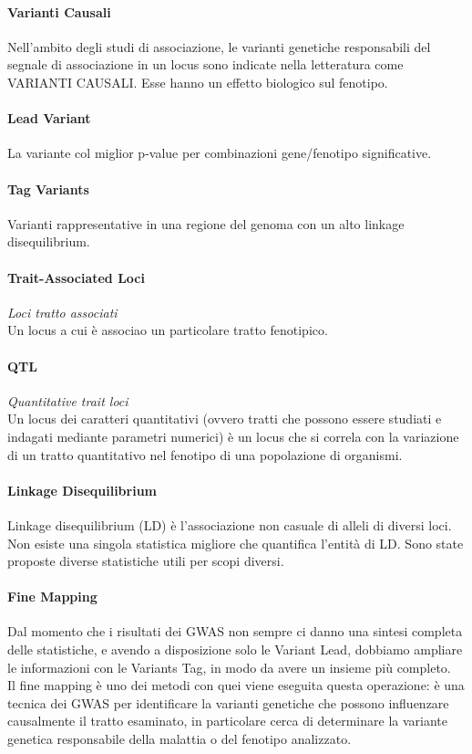 \documentclass{article}
\begin{document}
\paragraph{Varianti Causali}Nell'ambito degli studi di associazione, le varianti genetiche responsabili del segnale di associazione in un locus sono indicate nella letteratura come VARIANTI CAUSALI. Esse hanno un effetto biologico sul fenotipo.
\paragraph{Lead Variant}La variante col miglior p-value per combinazioni gene/fenotipo significative.
\paragraph{Tag Variants}Varianti rappresentative in una regione del genoma con un alto linkage disequilibrium.
\paragraph{Trait-Associated Loci}\textit{Loci tratto associati}\\Un locus a cui è associao un particolare tratto fenotipico.
\paragraph{QTL}\textit{Quantitative trait loci}\\
    Un locus dei caratteri quantitativi (ovvero tratti che possono essere studiati e indagati mediante parametri numerici) è un locus che si correla con la variazione di un tratto quantitativo nel fenotipo di una popolazione di organismi.
\paragraph{Linkage Disequilibrium} Linkage disequilibrium (LD) è l'associazione non casuale di alleli di diversi loci. Non esiste una singola statistica migliore che quantifica l'entità di LD. Sono state proposte diverse statistiche utili per scopi diversi.
\paragraph{Fine Mapping}Dal momento che i risultati dei GWAS non sempre ci danno una sintesi completa delle statistiche, e avendo a disposizione solo le Variant Lead, dobbiamo ampliare le informazioni con le Variants Tag, in modo da avere un insieme più completo.\\Il fine mapping è uno dei metodi con quei viene eseguita questa operazione: è una tecnica dei GWAS per identificare la varianti genetiche che possono influenzare causalmente il tratto esaminato, in particolare cerca di determinare la variante genetica responsabile della malattia o del fenotipo analizzato.
\end{document}
